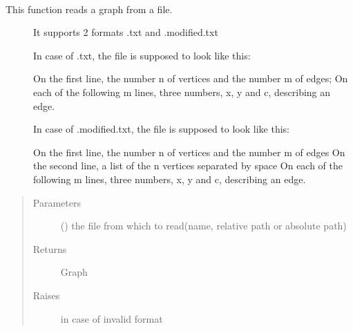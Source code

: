\documentclass[letterpaper,10pt,english]{sphinxmanual}
\begin{document}
\begin{fulllineitems}
\label{\detokenize{UndirectedGraph:UndirectedGraph.read_graph}}~\begin{description}
\item[{This function reads a graph from a file.}] \leavevmode
It supports 2 formats
.txt and  .modified.txt

In case of .txt, the file is supposed to look like this:

On the first line, the number n of vertices and the number m of edges;
On each of the following m lines, three numbers, x, y and c, describing an edge.

In case of .modified.txt, the file is supposed to look like this:

On the first line, the number n of vertices and the number m of edges
On the second line, a list of the n vertices separated by space
On each of the following m lines, three numbers, x, y and c, describing an edge.

\end{description}
\begin{quote}\begin{description}
\item[{Parameters}] \leavevmode
{} () \textendash{} the file from which to read(name, relative path or absolute path)

\item[{Returns}] \leavevmode
Graph

\item[{Raises}] \leavevmode
{} \textendash{} in case of invalid format

\end{description}\end{quote}

\end{fulllineitems}

\end{document}
